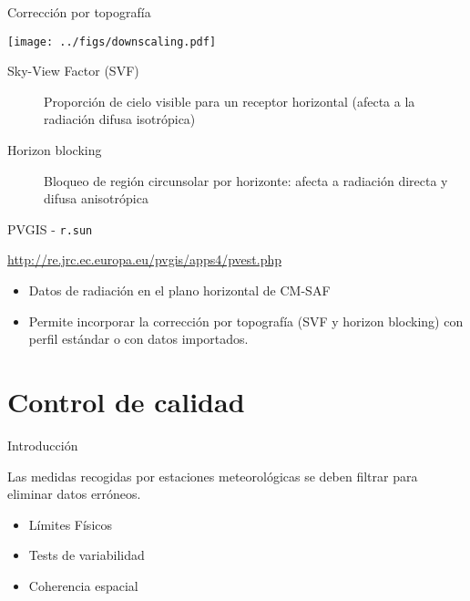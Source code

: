 \documentclass[aspectratio=169, usenames,svgnames,dvipsnames]{beamer}
\begin{document}
\begin{frame}[label={sec:orgf04af85}]{Corrección por topografía}
\begin{center}
\begin{center}
\texttt{[image: ../figs/downscaling.pdf]}
\end{center}
\end{center}

\begin{description}
\item[{Sky-View Factor (SVF)}] Proporción de cielo visible para un receptor horizontal (afecta a la radiación difusa isotrópica)

\item[{Horizon blocking}] Bloqueo de región circunsolar por horizonte: afecta a radiación directa y difusa anisotrópica
\end{description}


\nocite{Bosch.Batlles.ea2010}
\nocite{Tovar-Pescador.Pozo-Vazquez.ea2006}
\nocite{Antonanzas-Torres.MartinezdePison.ea2013}
\nocite{Hofierka.Suri2002}
\end{frame}

\begin{frame}[label={sec:org1c69738},fragile]{PVGIS - \texttt{r.sun}}
 \begin{block}{\url{http://re.jrc.ec.europa.eu/pvgis/apps4/pvest.php}}
\begin{itemize}
\item Datos de radiación en el plano horizontal de CM-SAF
\item Permite incorporar la corrección por topografía (SVF y horizon blocking) con perfil estándar o con datos importados.
\end{itemize}
\end{block}
\end{frame}
\section{Control de calidad}
\label{sec:org1dc1cd1}
\begin{frame}[label={sec:org01eb97d}]{Introducción}
\begin{block}{Las medidas recogidas por estaciones meteorológicas se deben filtrar para eliminar datos erróneos.}
\begin{itemize}
\item Límites Físicos
\item Tests de variabilidad
\item Coherencia espacial
\end{itemize}
\end{block}
\end{frame}
\end{document}
